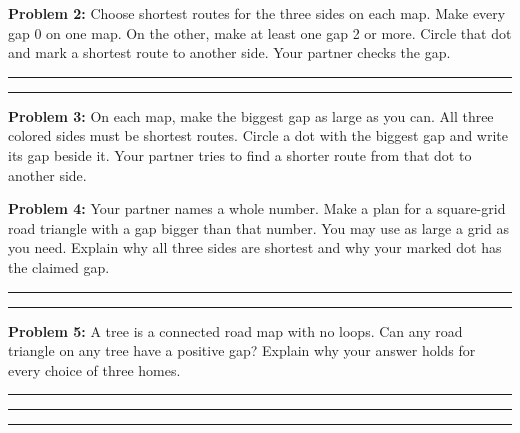 \documentclass[12pt,letterpaper]{article}
\newcommand{\problem}[2]{\par\textbf{Problem #1:} #2\par}
\newcommand{\grid}[1]{\draw[gray!60,line width=.6pt,step=1] (0,0) grid (#1,#1);\foreach \x in {0,...,#1}\foreach \y in {0,...,#1}\fill (\x,\y) circle (1.7pt);}
\newcommand{\home}[3]{\node[draw,circle,fill=white,inner sep=2.5pt,font=\bfseries] at (#1,#2){#3};}
\newcommand{\corners}[1]{\home{0}{0}{A}\home{#1}{0}{B}\home{#1}{#1}{C}}
\begin{document}
\problem{2}{Choose shortest routes for the three sides on each map. Make every gap 0 on one map. On the other, make at least one gap 2 or more. Circle that dot and mark a shortest route to another side. Your partner checks the gap.}
\vspace{.3in}
\begin{center}
\hfill
{}
\end{center}
\vspace{.4in}\rule{\linewidth}{.4pt}\par\vspace{.4in}\rule{\linewidth}{.4pt}
\newpage
\problem{3}{On each map, make the biggest gap as large as you can. All three colored sides must be shortest routes. Circle a dot with the biggest gap and write its gap beside it. Your partner tries to find a shorter route from that dot to another side.}
\vspace{.2in}
\begin{center}
\hspace{1.0in}
\vspace{.45in}

\end{center}
\newpage
\problem{4}{Your partner names a whole number. Make a plan for a square-grid road triangle with a gap bigger than that number. You may use as large a grid as you need. Explain why all three sides are shortest and why your marked dot has the claimed gap.}
\vspace{2.6in}
\rule{\linewidth}{.4pt}\par\vspace{.4in}\rule{\linewidth}{.4pt}
\vspace{.25in}
\problem{5}{A tree is a connected road map with no loops. Can any road triangle on any tree have a positive gap? Explain why your answer holds for every choice of three homes.}
\vspace{1.0in}\rule{\linewidth}{.4pt}\par\vspace{.4in}\rule{\linewidth}{.4pt}\par\vspace{.4in}\rule{\linewidth}{.4pt}
\end{document}
